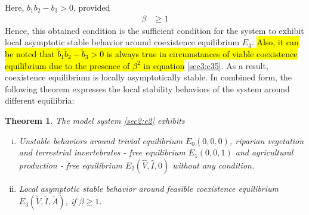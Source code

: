 \documentclass[12pt]{article}
\newtheorem{theorem}{Theorem}[section]
\numberwithin{equation}{section}
\begin{document}
Here, $b_1b_2-b_3>0$, provided
\begin{align}\label{sec3:e36}
\beta &\geq 1
\end{align} 
Hence, this obtained condition is the sufficient condition for the system to exhibit local asymptotic stable behavior around coexistence equilibrium $E_3$.
\hl{Also, it can be noted that $\tilde b_1\tilde b_2-\tilde b_3>0$ is always true in circumstances of viable coexistence equilibrium due to the presence of $\beta^2$ in equation} \eqref{sec3:e35}. As a result, coexistence equilibrium is locally asymptotically stable.
In combined form, the following theorem expresses the local stability behaviors of the system around different equilibria:
\begin{theorem}\label{Theorem 3.4}
The model system \eqref{sec2:e2} exhibits
\begin{enumerate}[i)]
\item Unstable behaviors around trivial equilibrium $E_0(0,0,0)$, riparian vegetation and terrestrial invertebrates - free equilibrium $E_1(0,0,1)$ and agricultural production - free equilibrium $E_2(\hat V,\hat I,0)$ without any condition.
\item Local asymptotic stable behavior around feasible coexistence equilibrium $E_3(\tilde V,\tilde I,\tilde A)$, if $\beta\geq 1$.
\end{enumerate}
 \end{theorem}
\end{document}
